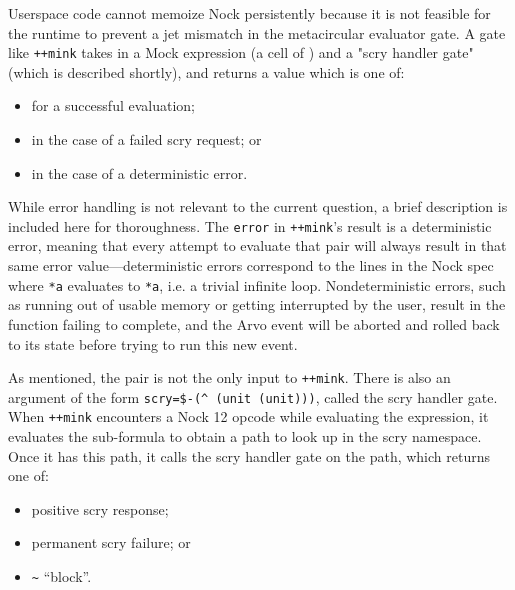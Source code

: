 \documentclass[twoside]{article}
\begin{document}
Userspace code cannot memoize Nock persistently because it is not feasible for the runtime to prevent a jet mismatch in the metacircular evaluator gate.  A gate like \texttt{++mink} takes in a Mock expression (a cell of \texttt{}) and a "scry handler gate" (which is described shortly), and returns a value which is one of:

\begin{itemize}
  \item  \texttt{} for a successful evaluation;
  \item  \texttt{} in the case of a failed scry request; or
  \item  \texttt{} in the case of a deterministic error.
\end{itemize}

\noindent
While error handling is not relevant to the current question, a brief description is included here for thoroughness.  The \texttt{error} in \texttt{++mink}'s result \texttt{} is a deterministic error, meaning that every attempt to evaluate that \texttt{} pair will always result in that same error value—deterministic errors correspond to the lines in the Nock spec where \texttt{*a} evaluates to \texttt{*a}, i.e. a trivial infinite loop.  Nondeterministic errors, such as running out of usable memory or getting interrupted by the user, result in the function failing to complete, and the Arvo event will be aborted and rolled back to its state before trying to run this new event.

As mentioned, the \texttt{} pair is not the only input to \texttt{++mink}.  There is also an argument of the form \texttt{scry=\$-(\string^ (unit (unit)))}, called the scry handler gate.  When \texttt{++mink} encounters a Nock 12 opcode while evaluating the \texttt{} expression, it evaluates the sub-formula to obtain a path to look up in the scry namespace.  Once it has this path, it calls the scry handler gate on the path, which returns one of:

\begin{itemize}
  \item  \texttt{} positive scry response;
  \item  \texttt{\string[\textasciitilde \textasciitilde\string] }permanent scry failure; or
  \item  \texttt{\textasciitilde} ``block''.
\end{itemize}
\end{document}
